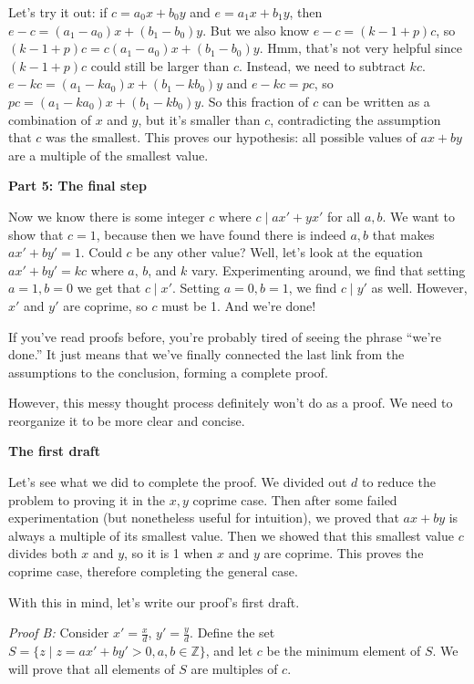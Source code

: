 \documentclass[11pt]{article}
\begin{document}
    Let's try it out: if $c=a_0x+b_0y$ and $e=a_1x+b_1y$, then 
    $e-c=(a_1-a_0)x+(b_1-b_0)y$. But we also know $e-c=(k-1+p)c$, so
    $(k-1+p)c=c(a_1-a_0)x+(b_1-b_0)y$. Hmm, that's not very helpful since $(k-1+p)c$
    could still be larger than $c$. Instead, we need to subtract $kc$.
    $e-kc=(a_1-ka_0)x+(b_1-kb_0)y$ and $e-kc=pc$, so $pc=(a_1-ka_0)x+(b_1-kb_0)y$. So
    this fraction of $c$ can be written as a combination of $x$ and $y$, but it's smaller
    than $c$, contradicting the assumption that $c$ was the smallest. This proves our
    hypothesis: all possible values of $ax+by$ are a multiple of the smallest value.
    
    \textbf{Part 5: The final step}
    
    Now we know there is some integer $c$ where $c\mid ax'+yx'$ for all $a,b$. We want
    to show that $c=1$, because then we have found there is indeed $a,b$ that makes
    $ax'+by'=1$. Could $c$ be any other value? Well, let's look at the equation
    $ax'+by'=kc$ where $a$, $b$, and $k$ vary. Experimenting around, we find that setting
    $a=1,b=0$ we get that $c\mid x'$. Setting $a=0,b=1$, we find $c\mid y'$ as well.
    However, $x'$ and $y'$ are coprime, so $c$ must be 1. And we're done!
    
    If you've read proofs before, you're probably tired of seeing the phrase
    ``we're done.'' It just means that we've finally connected the last link from the
    assumptions to the conclusion, forming a complete proof.
    
    However, this messy thought process definitely won't do as a proof. We need to
    reorganize it to be more clear and concise.


    \textbf{The first draft}
    
    Let's see what we did to complete the proof. We divided out $d$ to reduce the problem
    to proving it in the $x,y$ coprime case. Then after some failed experimentation
    (but nonetheless useful for intuition), we proved that $ax+by$ is always a multiple
    of its smallest value. Then we showed that this smallest value $c$ divides both $x$
    and $y$, so it is 1 when $x$ and $y$ are coprime. This proves the coprime case,
    therefore completing the general case.
    
    With this in mind, let's write our proof's first draft.
    
    \textit{Proof B:} Consider $x'=\frac xd$, $y'=\frac yd$. Define the set
    $S=\{z\mid z=ax'+by'>0,a,b\in\mathbb Z\}$, and let $c$ be the minimum element of $S$.
    We will prove that all elements of $S$ are multiples of $c$.
    
\end{document}
